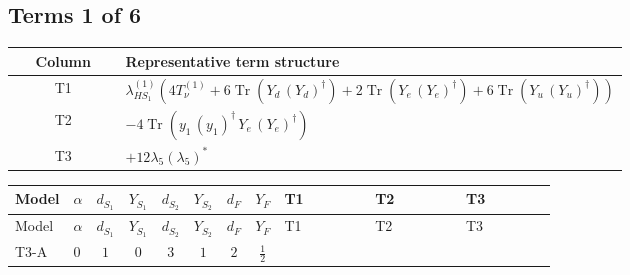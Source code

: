 \documentclass[8pt]{article}
\begin{document}
\begin{landscape}
\subsection*{Terms 1 of 6}
\begin{center}
\begin{tabular}{@{}c >{\raggedright\arraybackslash}p{0.82\linewidth}@{}}
\toprule
Column & Representative term structure \\
\midrule
T1 & \(\displaystyle {\lambda_{HS_1}^{(1)}} (4 T_{\nu}^{(1)}+6 \operatorname{Tr}\!\left({Y_d}\,\left({Y_d}\right)^{\dagger}\right)+2 \operatorname{Tr}\!\left({Y_e}\,\left({Y_e}\right)^{\dagger}\right)+6 \operatorname{Tr}\!\left({Y_u}\,\left({Y_u}\right)^{\dagger}\right))\) \\
\midrule
T2 & \(\displaystyle -4 \operatorname{Tr}\!\left({y_1}\,\left({y_1}\right)^{\dagger}\,{Y_e}\,\left({Y_e}\right)^{\dagger}\right)\) \\
\midrule
T3 & \(\displaystyle +12 {\lambda_5} \left({\lambda_5}\right)^{*}\) \\
\midrule
\bottomrule
\end{tabular}
\end{center}
\smallskip
\tiny
\begin{longtable}{@{}llcccccc >{\raggedright\arraybackslash}p{0.21\linewidth} >{\raggedright\arraybackslash}p{0.21\linewidth} >{\raggedright\arraybackslash}p{0.21\linewidth}@{}}
\toprule
Model & $\alpha$ & $d_{S_1}$ & $Y_{S_1}$ & $d_{S_2}$ & $Y_{S_2}$ & $d_F$ & $Y_F$ & T1 & T2 & T3 \\
\midrule
\endfirsthead
\toprule
Model & $\alpha$ & $d_{S_1}$ & $Y_{S_1}$ & $d_{S_2}$ & $Y_{S_2}$ & $d_F$ & $Y_F$ & T1 & T2 & T3 \\
\midrule
\endhead
T3-A & $0$ & $1$ & $0$ & $3$ & $1$ & $2$ & $\frac{1}{2}$ & \scriptsize\adjustbox{max width=\linewidth}{$\begin{gathered} {\lambda_{HS_1}^{(1)}} (4 T_{\nu}^{(1)}+6 \operatorname{Tr}\!\left({Y_d}\,\left({Y_d}\right)^{\dagger}\right)+2 \operatorname{Tr}\!\left({Y_e}\,\left({Y_e}\right)^{\dagger}\right)+6 \operatorname{Tr}\!\left({Y_u}\,\left({Y_u}\right)^{\dagger}\right))\end{gathered}$} & \scriptsize\adjustbox{max width=\linewidth}{$\begin{gathered} -4 \operatorname{Tr}\!\left({y_1}\,\left({y_1}\right)^{\dagger}\,{Y_e}\,\left({Y_e}\right)^{\dagger}\right)\end{gathered}$} & \scriptsize\adjustbox{max width=\linewidth}{$\begin{gathered} +12 {\lambda_5} \left({\lambda_5}\right)^{*}\end{gathered}$} \\

\end{longtable}
\end{landscape}
\end{document}

